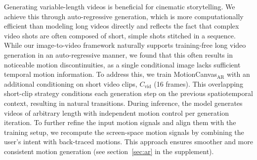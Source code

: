 Generating variable-length videos is beneficial for cinematic storytelling. We achieve this through auto-regressive generation, which is more computationally efficient than modeling long videos directly and reflects the fact that complex video shots are often composed of short, simple shots stitched in a sequence.
While our image-to-video framework naturally supports training-free long video generation in an auto-regressive manner, we found that this often results in noticeable motion discontinuities, as a single conditional image lacks sufficient temporal motion information.
To address this, we train MotionCanvas$_\text{AR}$ with an additional conditioning on short video clips, $C_\text{vid}$ (16 frames). This overlapping short-clip strategy conditions each generation step on the previous spatiotemporal context, resulting in natural transitions. During inference, the model generates videos of arbitrary length with independent motion control per generation iteration. 
To further refine the input motion signals and align them with the training setup, we recompute the screen-space motion signals by combining the user’s intent with back-traced motions.
This approach ensures smoother and more consistent motion generation (see section~\ref{sec:ar} in the supplement).
